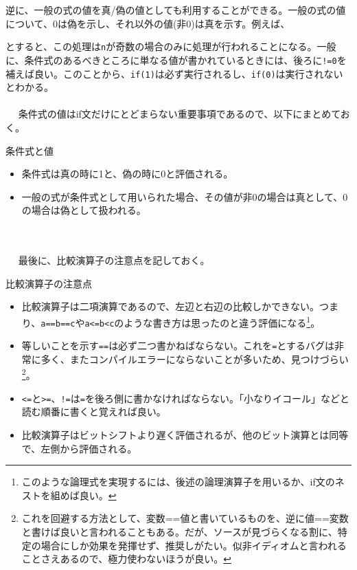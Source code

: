 逆に、一般の式の値を真/偽の値としても利用することができる。一般の式の値について、0は偽を示し、それ以外の値(非0)は真を示す。例えば、
とすると、この処理は\verb|n|が奇数の場合のみに処理が行われることになる。一般に、条件式のあるべきところに単なる値が書かれているときには、後ろに\verb|!=0|を補えば良い。このことから、\verb|if(1)|は必ず実行されるし、\verb|if(0)|は実行されないとわかる。
\\ \\　
条件式の値はif文だけにとどまらない重要事項であるので、以下にまとめておく。
\begin{itembox}[l]{条件式と値}
\begin{itemize}
\item 条件式は真の時に1と、偽の時に0と評価される。
\item 一般の式が条件式として用いられた場合、その値が非0の場合は真として、0の場合は偽として扱われる。
\end{itemize}
\end{itembox}
\\ \\　
最後に、比較演算子の注意点を記しておく。
\begin{itembox}[l]{比較演算子の注意点}
\begin{itemize}
\item 比較演算子は二項演算であるので、左辺と右辺の比較しかできない。つまり、\verb|a==b==c|や\verb|a<=b<c|のような書き方は思ったのと違う評価になる\footnote{このような論理式を実現するには、後述の論理演算子を用いるか、if文のネストを組めば良い。}。
\item 等しいことを示す\verb|==|は必ず二つ書かねばならない。これを\verb|=|とするバグは非常に多く、またコンパイルエラーにならないことが多いため、見つけづらい\footnote{これを回避する方法として、変数==値と書いているものを、逆に値==変数と書けば良いと言われることもある。だが、ソースが見づらくなる割に、特定の場合にしか効果を発揮せず、推奨しがたい。似非イディオムと言われることさえあるので、極力使わないほうが良い。}。
\item \verb|<=|と\verb|>=|、\verb|!=|は\verb|=|を後ろ側に書かなければならない。「小なりイコール」などと読む順番に書くと覚えれば良い。
\item 比較演算子はビットシフトより遅く評価されるが、他のビット演算とは同等で、左側から評価される。
\end{itemize}
\end{itembox}


